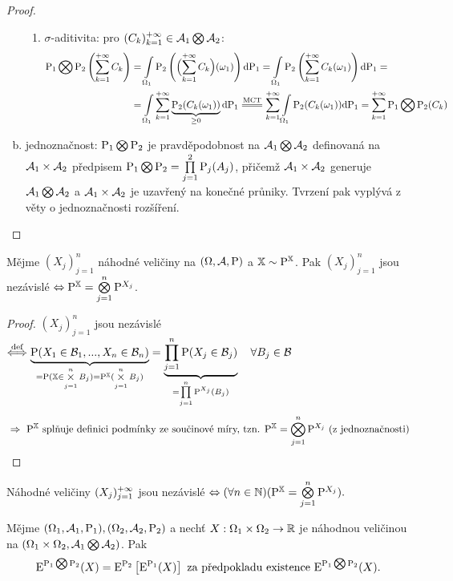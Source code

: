 \begin{theorem}
\begin{proof}
\begin{enumerate}[a)]
\begin{enumerate}[1)]
			\item $\sigma$-aditivita: pro $(C_k)_{k=1}^{+\infty}\in\mathcal{A}_1\bigotimes\mathcal{A}_2$: \[
			\begin{split}
			\PP_1\bigotimes \PP_2\left(\sum\limits_{k=1}^{+\infty} C_k\right)&=\int\limits_{\Omega_1}\PP_2\left(\Bigl( \sum\limits_{k=1}^{+\infty} C_k \Bigr)(\omega_1)\right)\dif \PP_1=\int\limits_{\Omega_1}\PP_2\left( \sum\limits_{k=1}^{+\infty} C_k(\omega_1) \right)\dif \PP_1= \\ &=\int\limits_{\Omega_1}\sum\limits_{k=1}^{+\infty} \underbrace{\PP_2(C_k(\omega_1))}_{\geq 0}\dif \PP_1\equal{\text{MCT}}\sum\limits_{k=1}^{+\infty} \int\limits_{\Omega_1}\PP_2(C_k(\omega_1))\dif \PP_1=\sum\limits_{k=1}^{+\infty} \PP_1\bigotimes \PP_2(C_k)
			\end{split}\]\end{enumerate}
			\item jednoznačnost: $\mathrm{P}_1\bigotimes \mathrm{P}_2$ je pravděpodobnost na $\mathcal{A}_1\bigotimes \mathcal{A}_2$ definovaná na $\mathcal{A}_1\times\mathcal{A}_2$ předpisem $\mathrm{P}_1\bigotimes \mathrm{P}_2=\prod\limits_{j=1}^2 \mathrm{P}_j(A_j)$, přičemž $\mathcal{A}_1\times\mathcal{A}_2$ generuje $\mathcal{A}_1\bigotimes\mathcal{A}_2$ a $\mathcal{A}_1\times\mathcal{A}_2$ je uzavřený na konečné průniky. Tvrzení pak vyplývá z věty o jednoznačnosti rozšíření.
		
	\end{enumerate}
\end{proof}
\end{theorem}
\begin{theorem}
	Mějme $(X_j)_{j=1}^n$ náhodné veličiny na $(\Omega,\mathcal{A},\mathrm{P})$ a $\mathbb{X}\sim \mathrm{P}^{\mathbb{X}}$. Pak $(X_j)_{j=1}^n$ jsou nezávislé $\Leftrightarrow \mathrm{P}^{\mathbb{X}} = \bigotimes\limits_{j=1}^n \mathrm{P}^{X_j}$.\begin{proof}
		$(X_j)_{j=1}^n$ jsou nezávislé $\stackrel{\text{def}}{\Longleftrightarrow}\underbrace{\mathrm{P}(X_1\in\mathcal{B}_1,...,X_n\in\mathcal{B}_n)}_{=\mathrm{P}(\mathbb{X}\in\bigtimes\limits_{j=1}^n B_j)=\mathrm{P}^{\mathbb{X}}(\bigtimes\limits_{j=1}^n B_j)}=\underbrace{\prod\limits_{j=1}^n \mathrm{P}(X_j\in\mathcal{B}_j)}_{=\prod\limits_{j=1}^n \mathrm{P}^{X_j}(B_j)}~~~\forall B_j\in\mathcal{B}$
		$$ ~\Rightarrow~ \mathrm{P}^{\mathbb{X}} \text{ splňuje definici podmínky ze součinové míry, tzn. }\mathrm{P}^{\mathbb{X}}=\bigotimes\limits_{j=1}^n \mathrm{P}^{X_j}\text{ (z jednoznačnosti)} $$
	\end{proof}
\end{theorem}
\begin{remark}
	Náhodné veličiny $(X_j)_{j=1}^{+\infty}$ jsou nezávislé $\Leftrightarrow(\forall n\in\mathbb{N})(\mathrm{P}^{\mathbb{X}}=\bigotimes\limits_{j=1}^n \mathrm{P}^{X_j}). $
\end{remark}
\begin{theorem}
	Mějme $(\Omega_1,\mathcal{A}_1,\mathrm{P}_1),(\Omega_2,\mathcal{A}_2,\mathrm{P}_2)$ a nechť $X:\Omega_1\times\Omega_2\to\mathbb{R}$ je náhodnou veličinou na $(\Omega_1\times\Omega_2,\mathcal{A}_1\bigotimes\mathcal{A}_2)$. Pak
	$$\mathrm{E} ^{\mathrm{P}_1\bigotimes \mathrm{P}_2}(X)=\mathrm{E} ^{\mathrm{P}_2}\left[ \mathrm{E} ^{\mathrm{P}_1}(X) \right]\text{ za předpokladu existence }\mathrm{E} ^{\mathrm{P}_1\bigotimes \mathrm{P}_2}(X).$$
\end{theorem}
